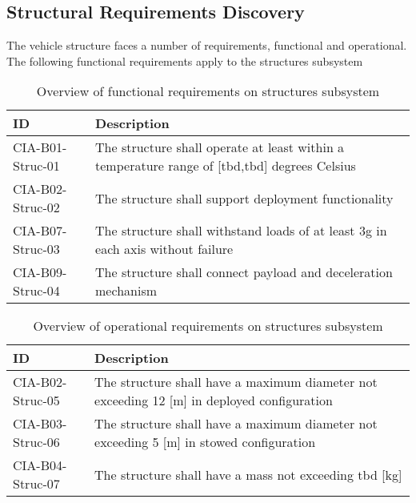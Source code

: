 \subsection{Structural Requirements Discovery} \label{sec:struct}
The vehicle structure faces a number of requirements, functional and operational. The following functional requirements apply to the structures subsystem

\begin{table}[H]
	\caption{Overview of functional requirements on structures subsystem}
	\begin{tabular}{|p{}|p{}|}
    \hline
    ID          & Description                                                                                                      \\ \hline \hline
    CIA-B01-Struc-01 & The structure shall operate at least within a temperature range of [\gls{tbd},\gls{tbd}] degrees Celsius           \\ \hline
    CIA-B02-Struc-02 & The structure shall support deployment functionality \\ \hline
    CIA-B07-Struc-03 & The structure shall withstand loads of at least 3g in each axis without failure                           \\ \hline
    CIA-B09-Struc-04 & The structure shall connect payload and deceleration mechanism \\ \hline
    \end{tabular}
    \label{tab:strucfuncrequirements}
\end{table}

\begin{table}[H]
	\caption{Overview of operational requirements on structures subsystem}
	\begin{tabular}{|p{}|p{}|}
    \hline
    ID          & Description                                                                                                      \\ \hline \hline
    CIA-B02-Struc-05 & The structure shall have a maximum diameter not exceeding 12 [m] in deployed configuration     \\ \hline
    CIA-B03-Struc-06 &  The structure shall have a maximum diameter not exceeding 5 [m] in stowed configuration                              \\ \hline
    CIA-B04-Struc-07 & The structure shall have a mass not exceeding \gls{tbd} [kg]\\ \hline
    \end{tabular}
    \label{tab:strucoprequirements}
\end{table}